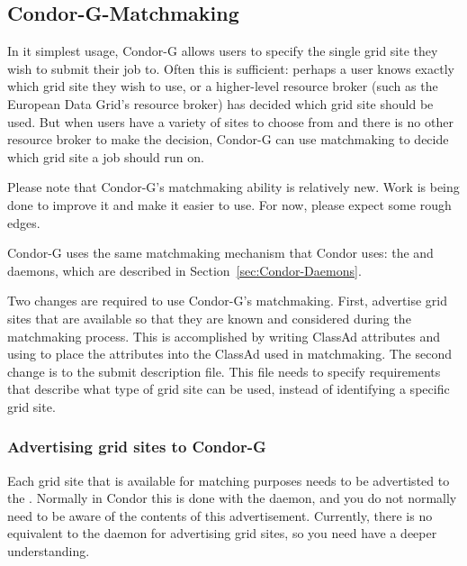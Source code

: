 \subsection{\label{sec:Condor-G-Matchmaking}Condor-G-Matchmaking}

In it simplest usage, Condor-G allows users to specify the single
grid site they wish to submit their job to.
Often this is sufficient: perhaps a user knows exactly which
grid site they wish to use,
or a higher-level resource broker
(such as the European Data Grid's resource broker)
has decided which grid site should be used.
But when users have a variety of sites to choose from and there
is no other resource broker to make the decision, Condor-G can use
matchmaking to decide which grid site a job should run on. 

Please note that Condor-G's matchmaking ability is relatively
new. Work is being done to improve it and make it easier to use. For
now, please expect some rough edges. 

Condor-G uses the same matchmaking mechanism that Condor uses: the
 and  daemons, which are described in
Section~\ref{sec:Condor-Daemons}. 

Two changes are required to use Condor-G's matchmaking.
First,
advertise grid sites that are available so that they are
known and considered during the matchmaking process.
This is accomplished by writing ClassAd attributes and
using  to place the attributes into the
ClassAd used in matchmaking.
The second change is to the
submit description file.
This file needs to specify requirements that describe what
type of grid site can be used, instead of identifying a specific grid site.


\subsubsection{Advertising grid sites to Condor-G}

Each grid site that is available for matching purposes needs to be
advertisted to the . Normally in Condor this is done
with the  daemon, and you do not normally need to be
aware of the contents of this advertisement. Currently, there is no
equivalent to the  daemon for advertising grid sites,
so you need have a deeper understanding. 

